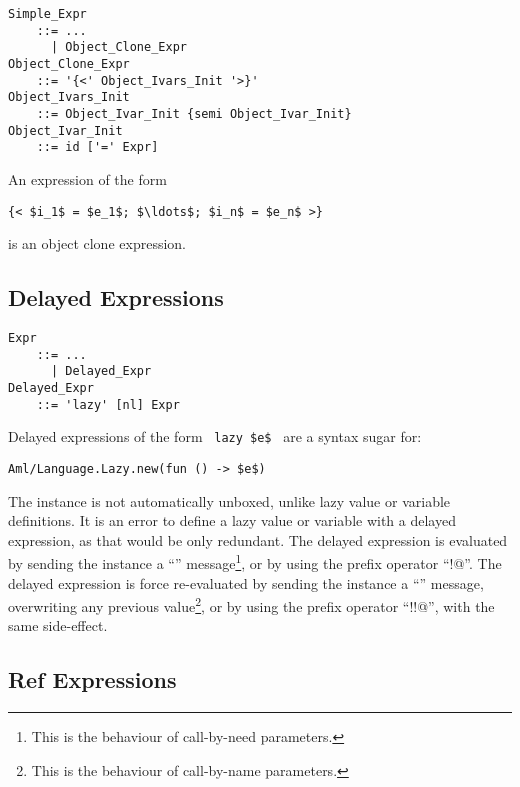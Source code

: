 \grammar\begin{lstlisting}
Simple_Expr 
    ::= ...
      | Object_Clone_Expr
Object_Clone_Expr 
    ::= '{<' Object_Ivars_Init '>}'
Object_Ivars_Init 
    ::= Object_Ivar_Init {semi Object_Ivar_Init}
Object_Ivar_Init
    ::= id ['=' Expr]
\end{lstlisting}

An expression of the form
\begin{lstlisting}
{< $i_1$ = $e_1$; $\ldots$; $i_n$ = $e_n$ >}
\end{lstlisting}
is an object clone expression. 





\subsection{Delayed Expressions}
\label{sec:delayed-expressions}

\grammar\begin{lstlisting}
Expr 
    ::= ...
      | Delayed_Expr
Delayed_Expr 
    ::= 'lazy' [nl] Expr
\end{lstlisting}

Delayed expressions of the form ~\lstinline!lazy $e$!~ are a syntax sugar for:
\begin{lstlisting}[deletekeywords={new}]
Aml/Language.Lazy.new(fun () -> $e$)
\end{lstlisting}

The  instance is not automatically unboxed, unlike lazy value or variable definitions. It is an error to define a lazy value or variable with a delayed expression, as that would be only redundant. The delayed expression is evaluated by sending the instance a ``'' message\footnote{This is the behaviour of call-by-need parameters.}, or by using the prefix operator ``\lstinline@!@''. The delayed expression is force re-evaluated by sending the instance a ``'' message, overwriting any previous value\footnote{This is the behaviour of call-by-name parameters.}, or by using the prefix operator ``\lstinline@!!@'', with the same side-effect. 






\subsection{Ref Expressions}
\label{sec:ref-expressions}

